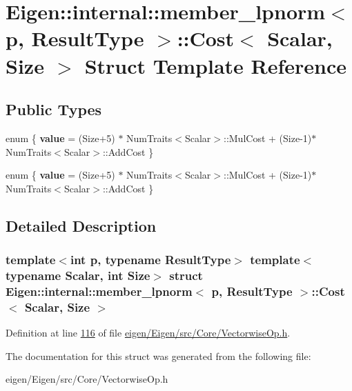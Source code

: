 \hypertarget{struct_eigen_1_1internal_1_1member__lpnorm_1_1_cost}{}\section{Eigen\+:\+:internal\+:\+:member\+\_\+lpnorm$<$ p, Result\+Type $>$\+:\+:Cost$<$ Scalar, Size $>$ Struct Template Reference}
\label{struct_eigen_1_1internal_1_1member__lpnorm_1_1_cost}
\subsection*{Public Types}
\begin{DoxyCompactItemize}
\item 
\mbox{\label{struct_eigen_1_1internal_1_1member__lpnorm_1_1_cost_ad7546cecd5fd8be51779050d75468b4f}} 
enum \{ {\bfseries value} = (Size+5) $\ast$ Num\+Traits$<$Scalar$>$\+:\+:Mul\+Cost + (Size-\/1)$\ast$\+Num\+Traits$<$Scalar$>$\+:\+:Add\+Cost
 \}
\item 
\mbox{\label{struct_eigen_1_1internal_1_1member__lpnorm_1_1_cost_a8ca02aae6c53344c73863ba6cfd23353}} 
enum \{ {\bfseries value} = (Size+5) $\ast$ Num\+Traits$<$Scalar$>$\+:\+:Mul\+Cost + (Size-\/1)$\ast$\+Num\+Traits$<$Scalar$>$\+:\+:Add\+Cost
 \}
\end{DoxyCompactItemize}


\subsection{Detailed Description}
\subsubsection*{template$<$int p, typename Result\+Type$>$\newline
template$<$typename Scalar, int Size$>$\newline
struct Eigen\+::internal\+::member\+\_\+lpnorm$<$ p, Result\+Type $>$\+::\+Cost$<$ Scalar, Size $>$}



Definition at line \hyperlink{eigen_2_eigen_2src_2_core_2_vectorwise_op_8h_source_l00116}{116} of file \hyperlink{eigen_2_eigen_2src_2_core_2_vectorwise_op_8h_source}{eigen/\+Eigen/src/\+Core/\+Vectorwise\+Op.\+h}.



The documentation for this struct was generated from the following file\+:\begin{DoxyCompactItemize}
\item 
eigen/\+Eigen/src/\+Core/\+Vectorwise\+Op.\+h\end{DoxyCompactItemize}
